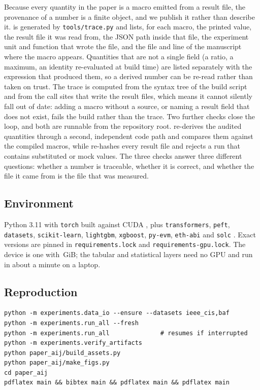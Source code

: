Because every quantity in the paper is a macro emitted from a result file, the
provenance of a number is a finite object, and we publish it rather than describe
it.  is generated by \texttt{tools/trace.py} and
lists, for each macro, the printed value, the result file it was read from, the
JSON path inside that file, the experiment unit and function that wrote the file,
and the file and line of the manuscript where the macro appears. Quantities that
are not a single field (a ratio, a maximum, an identity re-evaluated at build time)
are listed separately with the expression that produced them, so a derived number
can be re-read rather than taken on trust. The trace is computed from the syntax
tree of the build script and from the call sites that write the result files, which
means it cannot silently fall out of date: adding a macro without a source, or
naming a result field that does not exist, fails the build rather than the trace.
Two further checks close the loop, and both are runnable from the repository root.
 re-derives the audited quantities through a
second, independent code path and compares them against the compiled macros, while
 re-hashes every result file and rejects a
run that contains substituted or mock values. The three checks answer three
different questions: whether a number is traceable, whether it is correct, and
whether the file it came from is the file that was measured.

\subsection*{Environment}

Python 3.11 with \texttt{torch} \TorchVer{} built against CUDA \CudaVer, plus
\texttt{transformers}, \texttt{peft}, \texttt{datasets}, \texttt{scikit-learn},
\texttt{lightgbm}, \texttt{xgboost}, \texttt{py-evm}, \texttt{eth-abi} and
\texttt{solc} \SolcVer. Exact versions are pinned in \texttt{requirements.lock} and
\texttt{requirements-gpu.lock}. The device is one \GpuName{} with \GpuMemGiB\,GiB;
the tabular and statistical layers need no GPU and run in about a minute on a
laptop.

\subsection*{Reproduction}

\begin{verbatim}
python -m experiments.data_io --ensure --datasets ieee_cis,baf
python -m experiments.run_all --fresh
python -m experiments.run_all              # resumes if interrupted
python -m experiments.verify_artifacts
python paper_aij/build_assets.py
python paper_aij/make_figs.py
cd paper_aij
pdflatex main && bibtex main && pdflatex main && pdflatex main
\end{verbatim}


